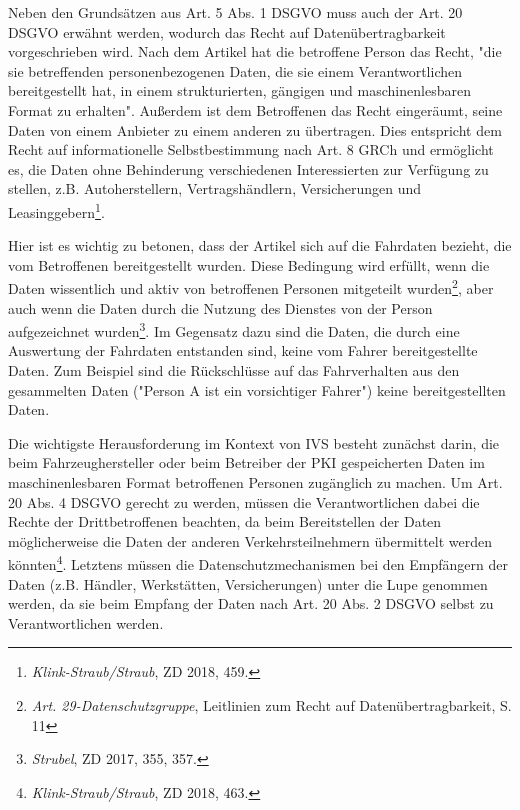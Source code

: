 Neben den Grundsätzen aus Art. 5 Abs. 1 DSGVO muss auch der Art. 20 DSGVO erwähnt werden, wodurch das Recht auf Datenübertragbarkeit vorgeschrieben wird. Nach dem Artikel hat die betroffene Person das Recht, "die sie betreffenden personenbezogenen Daten, die sie einem Verantwortlichen bereitgestellt hat, in einem strukturierten, gängigen und maschinenlesbaren Format zu erhalten". Außerdem ist dem Betroffenen das Recht eingeräumt, seine Daten von einem Anbieter zu einem anderen zu übertragen. Dies entspricht dem Recht auf informationelle Selbstbestimmung nach Art. 8 GRCh und ermöglicht es, die Daten ohne Behinderung verschiedenen Interessierten zur Verfügung zu stellen, z.B. Autoherstellern, Vertragshändlern, Versicherungen und Leasinggebern\footnote{\emph{Klink-Straub/Straub}, ZD 2018, 459.}. \nocite{Straub2018}

Hier ist es wichtig zu betonen, dass der Artikel sich auf die Fahrdaten bezieht, die vom Betroffenen bereitgestellt wurden. Diese Bedingung wird erfüllt, wenn die Daten wissentlich und aktiv von betroffenen Personen mitgeteilt wurden\footnote{\emph{Art. 29-Datenschutzgruppe}, Leitlinien zum Recht auf Datenübertragbarkeit, S. 11}, aber auch wenn die Daten durch die Nutzung des Dienstes von der Person aufgezeichnet wurden\footnote{\emph{Strubel}, ZD 2017, 355, 357.}\nocite{Strubel2017}. Im Gegensatz dazu sind die Daten, die durch eine Auswertung der Fahrdaten entstanden sind, keine vom Fahrer bereitgestellte Daten. Zum Beispiel sind die Rückschlüsse auf das Fahrverhalten aus den gesammelten Daten ("Person A ist ein vorsichtiger Fahrer") keine bereitgestellten Daten. 

Die wichtigste Herausforderung im Kontext von IVS besteht zunächst darin, die beim Fahrzeughersteller oder beim Betreiber der PKI gespeicherten Daten im maschinenlesbaren Format betroffenen Personen zugänglich zu machen. Um Art. 20 Abs. 4 DSGVO gerecht zu werden, müssen die Verantwortlichen dabei die Rechte der Drittbetroffenen beachten, da beim Bereitstellen der Daten möglicherweise die Daten der anderen Verkehrsteilnehmern übermittelt werden könnten\footnote{\emph{Klink-Straub/Straub}, ZD 2018, 463.}. Letztens müssen die Datenschutzmechanismen bei den Empfängern der Daten (z.B. Händler, Werkstätten, Versicherungen) unter die Lupe genommen werden, da sie beim Empfang der Daten nach Art. 20 Abs. 2 DSGVO selbst zu Verantwortlichen werden.



